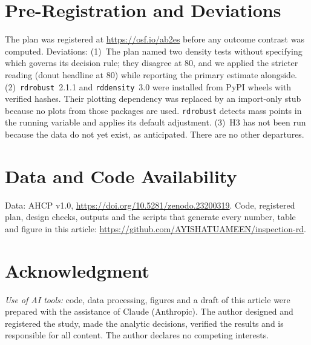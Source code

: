 \documentclass[10pt,twocolumn,letterpaper]{article}
\begin{document}
\section*{Pre-Registration and Deviations}
The plan was registered at \url{https://osf.io/ab2es} before any outcome contrast was computed. Deviations:
(1)~The plan named two density tests without specifying which governs its decision rule; they disagree at 80, and we applied the stricter reading (donut headline at 80) while reporting the primary estimate alongside.
(2)~\texttt{rdrobust}~2.1.1 and \texttt{rddensity}~3.0 were installed from PyPI wheels with verified hashes. Their plotting dependency was replaced by an import-only stub because no plots from those packages are used. \texttt{rdrobust} detects mass points in the running variable and applies its default adjustment.
(3)~H3 has not been run because the data do not yet exist, as anticipated.
There are no other departures.

\section*{Data and Code Availability}
Data: AHCP v1.0, \url{https://doi.org/10.5281/zenodo.23200319}. Code, registered plan, design checks, outputs and the scripts that generate every number, table and figure in this article: \url{https://github.com/AYISHATUAMEEN/inspection-rd}.

\section*{Acknowledgment}
\emph{Use of AI tools:} code, data processing, figures and a draft of this article were prepared with the assistance of Claude (Anthropic). The author designed and registered the study, made the analytic decisions, verified the results and is responsible for all content. The author declares no competing interests.
\end{document}
